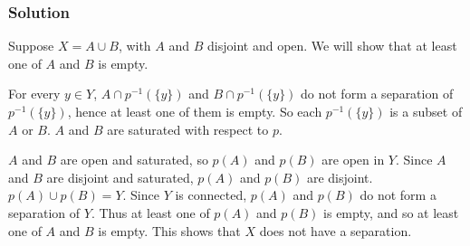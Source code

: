 \subsubsection{Solution}
Suppose $X = A \cup B$, with $A$ and $B$ disjoint and open. We will show that at least one of $A$ and $B$ is empty.

For every $y \in Y$, $A \cap p^{-1}(\{y\})$ and $B \cap p^{-1}(\{y\})$ do not form a separation of $p^{-1}(\{y\})$, hence at least one of them is empty. So each $p^{-1}(\{y\})$ is a subset of $A$ or $B$. $A$ and $B$ are saturated with respect to $p$.

$A$ and $B$ are open and saturated, so $p(A)$ and $p(B)$ are open in $Y$. Since $A$ and $B$ are disjoint and saturated, $p(A)$ and $p(B)$ are disjoint. $p(A) \cup p(B) = Y$. Since $Y$ is connected, $p(A)$ and $p(B)$ do not form a separation of $Y$. Thus at least one of $p(A)$ and $p(B)$ is empty, and so at least one of $A$ and $B$ is empty. This shows that $X$ does not have a separation.
